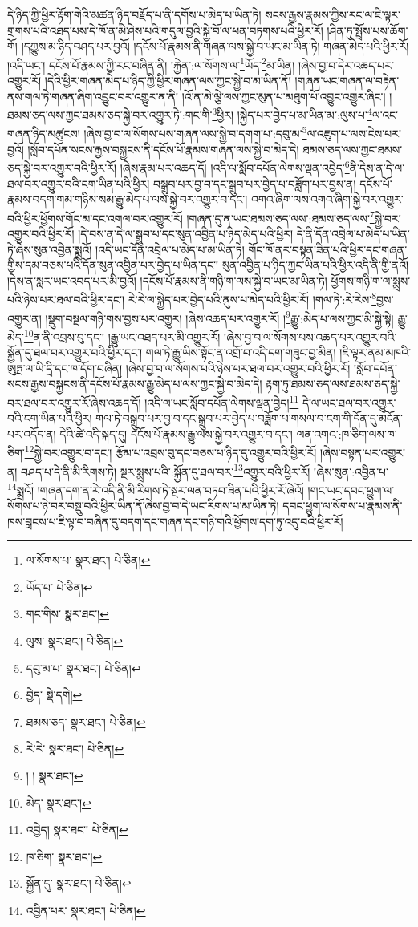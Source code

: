 དེ་ཉིད་ཀྱི་ཕྱིར་རྟོག་གེའི་མཚན་ཉིད་བརྗོད་པ་ནི་དགོས་པ་མེད་པ་ཡིན་ཏེ། སངས་རྒྱས་རྣམས་ཀྱིས་རང་ལ་ཇི་ལྟར་གྲགས་པའི་འཐད་པས་དེ་ཁོ་ན་མི་ཤེས་པའི་གདུལ་བྱའི་སྐྱེ་བོ་ལ་ཕན་བཏགས་པའི་ཕྱིར་རོ། །ཤིན་ཏུ་སྤྲོས་པས་ཆོག་གོ། །དཀྱུས་མ་ཉིད་བཤད་པར་བྱའོ། །དངོས་པོ་རྣམས་ནི་གཞན་ལས་སྐྱེ་བ་ཡང་མ་ཡིན་ཏེ། གཞན་མེད་པའི་ཕྱིར་རོ། །འདི་ཡང་། དངོས་པོ་རྣམས་ཀྱི་རང་བཞིན་ནི། །རྐྱེན་:ལ་སོགས་ལ་\footnote{ལ་སོགས་པ་  སྣར་ཐང་།  པེ་ཅིན། }ཡོད་\footnote{ཡོད་པ་  པེ་ཅིན། }མ་ཡིན། །ཞེས་བྱ་བ་དེར་འཆད་པར་འགྱུར་རོ། །དེའི་ཕྱིར་གཞན་མེད་པ་ཉིད་ཀྱི་ཕྱིར་གཞན་ལས་ཀྱང་སྐྱེ་བ་མ་ཡིན་ནོ། །གཞན་ཡང་གཞན་ལ་བརྟེན་ནས་གལ་ཏེ་གཞན་ཞིག་འབྱུང་བར་འགྱུར་ན་ནི། །འོ་ན་མེ་ལྕེ་ལས་ཀྱང་མུན་པ་མཐུག་པོ་འབྱུང་འགྱུར་ཞིང་། །ཐམས་ཅད་ལས་ཀྱང་ཐམས་ཅད་སྐྱེ་བར་འགྱུར་ཏེ་:གང་གི་\footnote{གང་གིས་  སྣར་ཐང་། }ཕྱིར། །སྐྱེད་པར་བྱེད་པ་མ་ཡིན་མ་:ལུས་པ་\footnote{ལུས་  སྣར་ཐང་།  པེ་ཅིན། }ལ་འང་གཞན་ཉིད་མཚུངས། །ཞེས་བྱ་བ་ལ་སོགས་པས་གཞན་ལས་སྐྱེ་བ་དགག་པ་:དབུ་མ་\footnote{དབུ་མ་པ་  སྣར་ཐང་།  པེ་ཅིན། }ལ་འཇུག་པ་ལས་ངེས་པར་བྱའོ། །སློབ་དཔོན་སངས་རྒྱས་བསྐྱངས་ནི་དངོས་པོ་རྣམས་གཞན་ལས་སྐྱེ་བ་མེད་དེ། ཐམས་ཅད་ལས་ཀྱང་ཐམས་ཅད་སྐྱེ་བར་འགྱུར་བའི་ཕྱིར་རོ། །ཞེས་རྣམ་པར་འཆད་དོ། །འདི་ལ་སློབ་དཔོན་ལེགས་ལྡན་འབྱེད་\footnote{བྱེད་  སྡེ་དགེ། }ནི་དེས་ན་དེ་ལ་ཐལ་བར་འགྱུར་བའི་ངག་ཡིན་པའི་ཕྱིར། བསྒྲུབ་པར་བྱ་བ་དང་སྒྲུབ་པར་བྱེད་པ་བཟློག་པར་བྱས་ན། དངོས་པོ་རྣམས་བདག་གམ་གཉིས་སམ་རྒྱུ་མེད་པ་ལས་སྐྱེ་བར་འགྱུར་བ་དང་། འགའ་ཞིག་ལས་འགའ་ཞིག་སྐྱེ་བར་འགྱུར་བའི་ཕྱིར་ཕྱོགས་གོང་མ་དང་འགལ་བར་འགྱུར་རོ། །གཞན་དུ་ན་ཡང་ཐམས་ཅད་ལས་:ཐམས་ཅད་ལས་\footnote{ཐམས་ཅད་  སྣར་ཐང་།  པེ་ཅིན། }སྐྱེ་བར་འགྱུར་བའི་ཕྱིར་རོ། །དེ་བས་ན་དེ་ལ་སྒྲུབ་པ་དང་སུན་འབྱིན་པ་ཉིད་མེད་པའི་ཕྱིར། དེ་ནི་དོན་འབྲེལ་པ་མེད་པ་ཡིན་ཏེ་ཞེས་སུན་འབྱིན་སྨྲའོ། །འདི་ཡང་དོན་འབྲེལ་པ་མེད་པ་མ་ཡིན་ཏེ། གོང་ཁོ་ནར་བསྟན་ཟིན་པའི་ཕྱིར་དང་གཞན་གྱིས་དམ་བཅས་པའི་དོན་སུན་འབྱིན་པར་བྱེད་པ་ཡིན་དང་། སུན་འབྱིན་པ་ཉིད་ཀྱང་ཡིན་པའི་ཕྱིར་འདི་ནི་གྱི་ནའོ། །དེས་ན་སླར་ཡང་འབད་པར་མི་བྱའོ། །དངོས་པོ་རྣམས་ནི་གཉི་ག་ལས་སྐྱེ་བ་ཡང་མ་ཡིན་ཏེ། ཕྱོགས་གཉི་ག་ལ་སྨྲས་པའི་ཉེས་པར་ཐལ་བའི་ཕྱིར་དང་། རེ་རེ་ལ་སྐྱེད་པར་བྱེད་པའི་ནུས་པ་མེད་པའི་ཕྱིར་རོ། །གལ་ཏེ་:རེ་རེས་\footnote{རེ་རེ་  སྣར་ཐང་།  པེ་ཅིན། }བྱས་འགྱུར་ན། །སྡུག་བསྔལ་གཉི་གས་བྱས་པར་འགྱུར། །ཞེས་འཆད་པར་འགྱུར་རོ། །\footnote{། །   སྣར་ཐང་། }རྒྱུ་:མེད་པ་ལས་ཀྱང་མི་སྐྱེ་སྟེ། རྒྱུ་མེད་\footnote{མེད་  སྣར་ཐང་། }ན་ནི་འབྲས་བུ་དང་། །རྒྱུ་ཡང་འཐད་པར་མི་འགྱུར་རོ། །ཞེས་བྱ་བ་ལ་སོགས་པས་འཆད་པར་འགྱུར་བའི་སྐྱོན་དུ་ཐལ་བར་འགྱུར་བའི་ཕྱིར་དང་། གལ་ཏེ་རྒྱུ་ཡིས་སྟོང་ན་འགྲོ་བ་འདི་དག་གཟུང་བྱ་མིན། །ཇི་ལྟར་ནམ་མཁའི་ཨུཏྤ་ལ་ཡི་དྲི་དང་ཁ་དོག་བཞིན། །ཞེས་བྱ་བ་ལ་སོགས་པའི་ཉེས་པར་ཐལ་བར་འགྱུར་བའི་ཕྱིར་རོ། །སློབ་དཔོན་སངས་རྒྱས་བསྐྱངས་ནི་དངོས་པོ་རྣམས་རྒྱུ་མེད་པ་ལས་ཀྱང་སྐྱེ་བ་མེད་དེ། རྟག་ཏུ་ཐམས་ཅད་ལས་ཐམས་ཅད་སྐྱེ་བར་ཐལ་བར་འགྱུར་རོ་ཞེས་འཆད་དོ། །འདི་ལ་ཡང་སློབ་དཔོན་ལེགས་ལྡན་བྱེད།\footnote{འབྱེད།  སྣར་ཐང་།  པེ་ཅིན། } དེ་ལ་ཡང་ཐལ་བར་འགྱུར་བའི་ངག་ཡིན་པའི་ཕྱིར། གལ་ཏེ་བསྒྲུབ་པར་བྱ་བ་དང་སྒྲུབ་པར་བྱེད་པ་བཟློག་པ་གསལ་བ་ངག་གི་དོན་དུ་མངོན་པར་འདོད་ན། དེའི་ཚེ་འདི་སྐད་དུ། དངོས་པོ་རྣམས་རྒྱུ་ལས་སྐྱེ་བར་འགྱུར་བ་དང་། ལན་འགའ་:ཁ་ཅིག་ལས་ཁ་ཅིག་\footnote{ཁ་ཅིག་  སྣར་ཐང་། }སྐྱེ་བར་འགྱུར་བ་དང་། རྩོམ་པ་འབྲས་བུ་དང་བཅས་པ་ཉིད་དུ་འགྱུར་བའི་ཕྱིར་རོ། །ཞེས་བསྟན་པར་འགྱུར་ན། བཤད་པ་དེ་ནི་མི་རིགས་ཏེ། སྔར་སྨྲས་པའི་:སྐྱོན་དུ་ཐལ་བར་\footnote{སྐྱོན་དུ་  སྣར་ཐང་།  པེ་ཅིན། }འགྱུར་བའི་ཕྱིར་རོ། །ཞེས་སུན་:འབྱིན་པ་\footnote{འབྱིན་པར་  སྣར་ཐང་།  པེ་ཅིན། }སྨྲའོ། །གཞན་དག་ན་རེ་འདི་ནི་མི་རིགས་ཏེ་སྔར་ལན་བཏབ་ཟིན་པའི་ཕྱིར་རོ་ཞེའོ། །གང་ཡང་དབང་ཕྱུག་ལ་སོགས་པ་ཉེ་བར་བསྡུ་བའི་ཕྱིར་ཡིན་ནོ་ཞེས་བྱ་བ་དེ་ཡང་རིགས་པ་མ་ཡིན་ཏེ། དབང་ཕྱུག་ལ་སོགས་པ་རྣམས་ནི་ཁས་བླངས་པ་ཇི་ལྟ་བ་བཞིན་དུ་བདག་དང་གཞན་དང་གཉི་གའི་ཕྱོགས་དག་ཏུ་འདུ་བའི་ཕྱིར་རོ། 